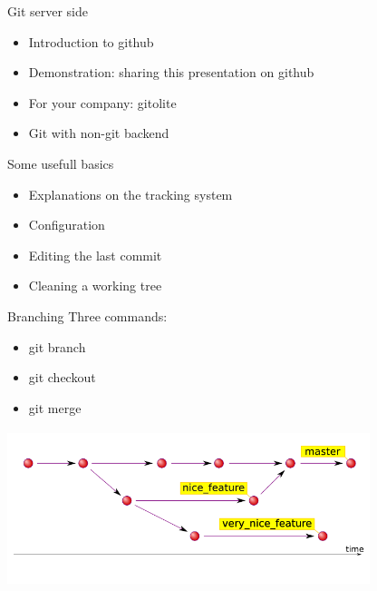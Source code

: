 \documentclass{beamer}
\begin{document}
\begin{frame}{Git server side}
    \begin{itemize}
        \item Introduction to github
        \pause
        \item Demonstration: sharing this presentation on github
        \pause
        \item For your company: gitolite
        \pause
        \item Git with non-git backend
    \end{itemize}
\end{frame}

\begin{frame}{Some usefull basics}
    \begin{itemize}
        \item Explanations on the tracking system
        \pause
        \item Configuration
        \pause
        \item Editing the last commit
        \pause
        \item Cleaning a working tree
    \end{itemize}
\end{frame}

\begin{frame}{Branching}
    Three commands: \\
    \begin{itemize}
        \item git branch
        \item git checkout
        \item git merge
    \end{itemize}
    \includegraphics[width=300pt,height=130pt]{branches.png}
\end{frame}
\end{document}

